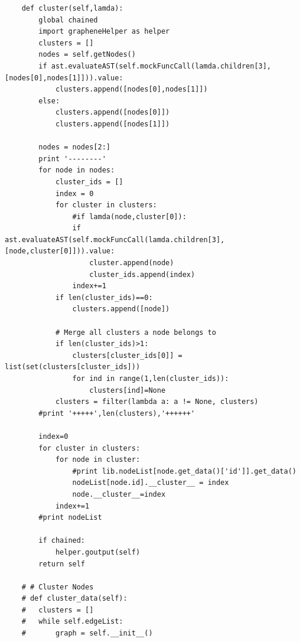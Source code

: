 \documentclass[a4paper]{article}
\begin{document}
\begin{verbatim}
	def cluster(self,lamda):
	    global chained
	    import grapheneHelper as helper
	    clusters = []
	    nodes = self.getNodes()
	    if ast.evaluateAST(self.mockFuncCall(lamda.children[3],[nodes[0],nodes[1]])).value:
	        clusters.append([nodes[0],nodes[1]])
	    else:
	        clusters.append([nodes[0]])
	        clusters.append([nodes[1]])
	    
	    nodes = nodes[2:]
	    print '--------'
	    for node in nodes:
	        cluster_ids = []
	        index = 0 
	        for cluster in clusters:
	            #if lamda(node,cluster[0]):
	            if ast.evaluateAST(self.mockFuncCall(lamda.children[3],[node,cluster[0]])).value:
	                cluster.append(node)
	                cluster_ids.append(index)
	            index+=1
	        if len(cluster_ids)==0:
	            clusters.append([node])

	        # Merge all clusters a node belongs to
	        if len(cluster_ids)>1:
	            clusters[cluster_ids[0]] = list(set(clusters[cluster_ids]))
	            for ind in range(1,len(cluster_ids)):
	                clusters[ind]=None
	        clusters = filter(lambda a: a != None, clusters)
	    #print '+++++',len(clusters),'++++++'

	    index=0
	    for cluster in clusters:
	        for node in cluster: 
	            #print lib.nodeList[node.get_data()['id']].get_data()
	            nodeList[node.id].__cluster__ = index
	            node.__cluster__=index
	        index+=1
	    #print nodeList
	    
	    if chained:
	    	helper.goutput(self)
	    return self

    # # Cluster Nodes
    # def cluster_data(self):
    # 	clusters = [] 
    # 	while self.edgeList:
    # 		graph = self.__init__()

\end{verbatim}
\end{document}
